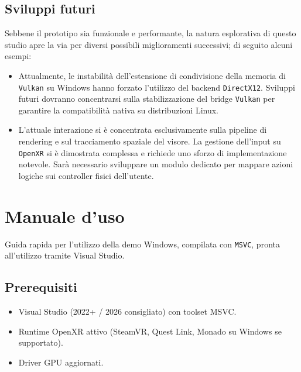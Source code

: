 \documentclass[a4paper, 11pt, twoside]{report}
\newif\ifshowlogo
\newcommand{\blankpage}{
    \clearpage
    \thispagestyle{empty}     %
    \showlogofalse            %
    \hbox{}                   %
    \newpage
    \showlogotrue             %
}
\begin{document}
\newpage

\section{Sviluppi futuri}

Sebbene il prototipo sia funzionale e performante, la natura esplorativa di questo studio apre la via per diversi
possibili miglioramenti successivi; di seguito alcuni esempi:

\begin{itemize}
    \item Attualmente, le instabilità dell'estensione di condivisione della memoria di \texttt{\gls{Vulkan}} su Windows
        hanno forzato l'utilizzo del backend \texttt{\gls{DirectX}12}.
        Sviluppi futuri dovranno concentrarsi sulla stabilizzazione del bridge \texttt{\gls{Vulkan}} per garantire la
        compatibilità nativa su distribuzioni Linux.
    \item L'attuale interazione si è concentrata esclusivamente sulla pipeline di rendering e sul tracciamento spaziale
        del visore. La gestione dell'input su \texttt{\gls{OpenXR}} si è dimostrata complessa e richiede uno sforzo di
        implementazione notevole.
        Sarà necessario sviluppare un modulo dedicato per mappare azioni logiche sui controller fisici dell'utente.
\end{itemize}

\blankpage
\blankpage
{}
\printglossary[title=Glossario, toctitle=Glossario]

\printbibliography[heading=bibintoc, title=Bibliografia]

\blankpage

\appendix
\chapter{Manuale d'uso}\label{annex:guide}

Guida rapida per l'utilizzo della demo Windows, compilata con \texttt{MSVC}, pronta all'utilizzo tramite Visual Studio.

\section{Prerequisiti}

\begin{itemize}
    \item Visual Studio (2022+ / 2026 consigliato) con toolset MSVC.
    \item Runtime OpenXR attivo (SteamVR, Quest Link, Monado su Windows se supportato).
    \item Driver GPU aggiornati.
\end{itemize}
\end{document}
